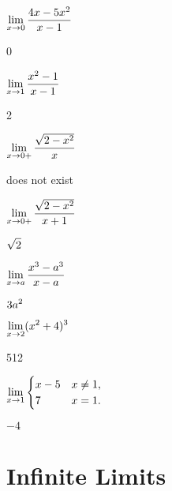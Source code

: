 \begin{exercises}
\begin{exercise} $\displaystyle \lim _{x\to 0 } {4x - 5x^2\over x-1}$
\begin{answer} 0
\end{answer}\end{exercise}

\begin{exercise} $\displaystyle\lim _{x\to 1 } {x^2 -1 \over x-1 }$
\begin{answer} 2
\end{answer}\end{exercise}

\begin{exercise} $\displaystyle\lim _{x\to 0 + } {\sqrt{2-x^2 }\over x}$
\begin{answer} does not exist
\end{answer}\end{exercise}

\begin{exercise} $\displaystyle\lim _{x\to 0 + } {\sqrt{2-x^2}\over x+1}$
\begin{answer} $\displaystyle \sqrt2$
\end{answer}\end{exercise}

\begin{exercise} $\displaystyle\lim _{x\to a } {x^3 -a^3\over x-a}$
\begin{answer} $\displaystyle 3a^2$
\end{answer}\end{exercise}

\begin{exercise} $\displaystyle\lim _{x\to 2 } (x^2 +4)^3$
\begin{answer} 512
\end{answer}\end{exercise}

\begin{exercise} $\displaystyle\lim _{x\to 1 } \begin{cases}
x-5 & x\ne 1, \\
7 & x=1. \end{cases}$
\begin{answer} $-4$
\end{answer}\end{exercise}

\endtwocol

\end{exercises}






\section{Infinite Limits}


